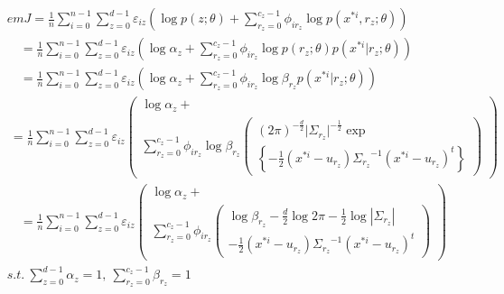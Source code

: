 \documentclass[runningheads,openany]{xhlPaper}
\begin{document}
\begin{equation}
\label{equ:pmmMixtureMixtureEMJ}
\begin{aligned}
&emJ = \frac{1}{n}\sum\limits_{i = 0}^{n - 1} {\sum\limits_{z = 0}^{d - 1} {{\varepsilon _{iz}}\left( {\log p\left( {z;\theta } \right) + \sum\limits_{{r_z} = 0}^{{c_z} - 1} {{\phi _{i{r_z}}}\log p\left( {{x^{*i}},{r_z};\theta } \right)} } \right)} } \\
 &\quad= \frac{1}{n}\sum\limits_{i = 0}^{n - 1} {\sum\limits_{z = 0}^{d - 1} {{\varepsilon _{iz}}\left( {\log {\alpha _z} + \sum\limits_{{r_z} = 0}^{{c_z} - 1} {{\phi _{i{r_z}}}\log p\left( {{r_z};\theta } \right)p\left( {{x^{*i}}|{r_z};\theta } \right)} } \right)} } \\
 &\quad= \frac{1}{n}\sum\limits_{i = 0}^{n - 1} {\sum\limits_{z = 0}^{d - 1} {{\varepsilon _{iz}}\left( {\log {\alpha _z} + \sum\limits_{{r_z} = 0}^{{c_z} - 1} {{\phi _{i{r_z}}}\log {\beta _{{r_z}}}p\left( {{x^{*i}}|{r_z};\theta } \right)} } \right)} } \\
 &\ = \frac{1}{n}\sum\limits_{i = 0}^{n - 1} {\sum\limits_{z = 0}^{d - 1} {{\varepsilon _{iz}}\left( \begin{array}{l}
\log {\alpha _z} + \\
\sum\limits_{{r_z} = 0}^{{c_z} - 1} {{\phi _{i{r_z}}}\log {\beta _{{r_z}}}\left( \begin{array}{l}
{\left( {2\pi } \right)^{ - \frac{d}{2}}}|{\Sigma _{{r_z}}}{|^{ - \frac{1}{2}}}\exp \\
\left\{ { - \frac{1}{2}\left( {{x^{*i}} - {u_{{r_z}}}} \right){\Sigma _{{r_z}}}^{ - 1}{{\left( {{x^{*i}} - {u_{{r_z}}}} \right)}^t}} \right\}
\end{array} \right)} 
\end{array} \right)} } \\
 &\quad= \frac{1}{n}\sum\limits_{i = 0}^{n - 1} {\sum\limits_{z = 0}^{d - 1} {{\varepsilon _{iz}}\left( \begin{array}{l}
\log {\alpha _z} + \\
\sum\limits_{{r_z} = 0}^{{c_z} - 1} {{\phi _{i{r_z}}}\left( \begin{array}{l}
\log {\beta _{{r_z}}} - \frac{d}{2}\log 2\pi  - \frac{1}{2}\log |{\Sigma _{{r_z}}}|\\
 - \frac{1}{2}\left( {{x^{*i}} - {u_{{r_z}}}} \right){\Sigma _{{r_z}}}^{ - 1}{\left( {{x^{*i}} - {u_{{r_z}}}} \right)^t}
\end{array} \right)} 
\end{array} \right)} } \\
&s.t.\ \sum\limits_{z = 0}^{d - 1} {{\alpha _z}}  = 1,\ \sum\limits_{{r_z} = 0}^{{c_z} - 1} {{\beta _{r_z}}}  = 1
\end{aligned}
\end{equation}
\end{document}
